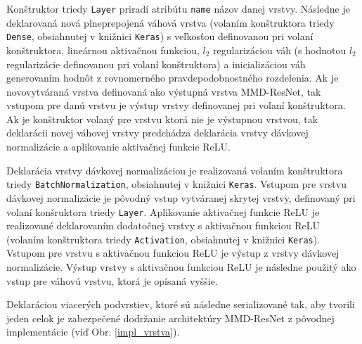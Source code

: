 Konštruktor triedy \texttt{Layer} priradí atribútu \texttt{name} názov danej vrstvy. Následne je deklarovaná nová plneprepojená váhová vrstva (volaním konštruktora triedy \texttt{Dense}, obsiahnutej v knižnici \texttt{Keras}) s veľkosťou definovanou pri volaní konštruktora, lineárnou aktivačnou funkciou, $l_2$ regularizáciou váh (s hodnotou $l_2$ regularizácie definovanou pri volaní konštruktora) a inicializáciou váh generovaním hodnôt z rovnomerného pravdepodobnostného rozdelenia. Ak je novovytváraná vrstva definovaná ako výstupná vrstva MMD-ResNet, tak vstupom pre danú vrstvu je výstup vrstvy definovanej pri volaní konštruktora. Ak je konštruktor volaný pre vrstvu ktorá nie je výstupnou vrstvou, tak deklarácii novej váhovej vrstvy predchádza deklarácia vrstvy dávkovej normalizácie a aplikovanie aktivačnej funkcie ReLU. 

Deklarácia vrstvy dávkovej normalizáciou je realizovaná volaním konštruktora triedy \texttt{BatchNormalization}, obsiahnutej v knižnici \texttt{Keras}. Vstupom pre vrstvu dávkovej normalizácie je pôvodný vstup vytváranej skrytej vrstvy, definovaný pri volaní konšruktora triedy \texttt{Layer}. Aplikovanie aktivačnej funkcie ReLU je realizované deklarovaním dodatočnej vrstvy s aktivačnou funkciou ReLU (volaním konštruktora triedy \texttt{Activation}, obsiahnutej v knižnici \texttt{Keras}). Vstupom pre vrstvu s aktivačnou funkciou ReLU je výstup z vrstvy dávkovej normalizácie. Výstup vrstvy s aktivačnou funkciou ReLU je následne použitý ako vstup pre váhovú vrstvu, ktorá je opísaná vyššie. 

Deklaráciou viacerých podvrstiev, ktoré sú následne serializované tak, aby tvorili jeden celok je zabezpečené dodržanie architektúry MMD-ResNet z pôvodnej implementácie (viď Obr. \ref{impl_vrstva}).

